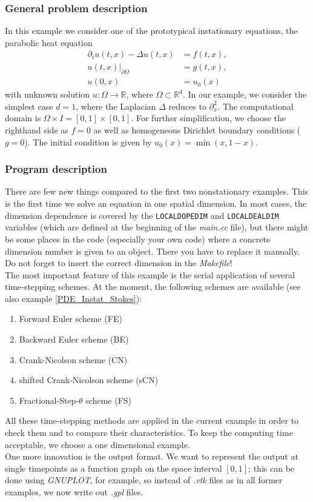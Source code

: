 \subsubsection{General problem description}

In this example we consider one of the prototypical instationary equations, the parabolic heat equation
\begin{align*}
\partial_t u(t,x) - \Delta u(t,x) &= f(t,x),\\
u(t,x)|_{\partial \Omega} &= g(t,x),\\
u(0,x) &= u_0(x)
\end{align*}
with unknown solution $u:\Omega \rightarrow \mathbb{R}$, where $\Omega \subset \mathbb{R}^d$. In our example, we consider the simplest case $d=1$, where the Laplacian $\Delta$ reduces to $\partial_x^2$. The computational domain is $\Omega \times I = [0,1] \times [0,1]$. For further simplification, we choose the righthand side as $f=0$ as well as homogeneous Dirichlet boundary conditions ($g=0$). The initial condition is given by $u_0(x) = \min(x,1-x)$.

\subsubsection{Program description}

There are few new things compared to the first two nonstationary examples. This is the first time we solve an equation in one spatial dimension. In most cases, the dimension dependence is covered by the \texttt{LOCALDOPEDIM} and \texttt{LOCALDEALDIM} variables (which are defined at the beginning of the \textit{main.cc} file), but there might be some places in the code (especially your own code) where a concrete dimension number is given to an object. There you have to replace it manually. Do not forget to insert the correct dimension in the \textit{Makefile}!\\
The most important feature of this example is the serial application of several time-stepping schemes. At the moment, the following schemes are available (see also example \ref{PDE_Instat_Stokes}):
\begin{enumerate}
\item
Forward Euler scheme (FE)
\item
Backward Euler scheme (BE)
\item
Crank-Nicolson scheme (CN)
\item
shifted Crank-Nicolson scheme (sCN)
\item
Fractional-Step-$\theta$ scheme (FS)
\end{enumerate}
All these time-stepping methods are applied in the current example in order to check them and to compare their characteristics. To keep the computing time acceptable, we choose a one dimensional example.\\
One more innovation is the output format. We want to represent the output at single timepoints as a function graph on the space interval $[0,1]$; this can be done using \textit{GNUPLOT}, for example, so instead of \textit{.vtk} files as in all former examples, we now write out \textit{.gpl} files.